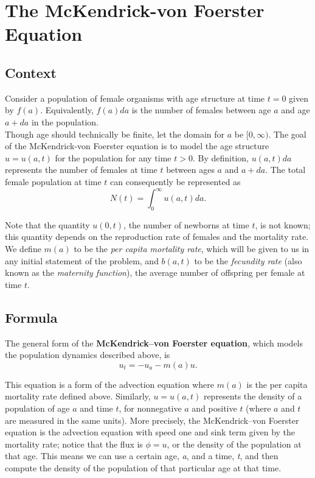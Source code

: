 \section{The McKendrick-von Foerster Equation}\setcounter{secnumdepth}{2}

\subsection{Context}


Consider a population of female organisms with age structure at time $t=0$ given by $f(a)$. Equivalently, $f(a)da$ is the number of females between age $a$ and age $a+da$ in the population. \\

Though age should technically be finite, let the domain for $a$ be $[0, \infty).$ The goal of the McKendrick-von Foerster equation is to model the age structure $u=u(a, t)$ for the population for any time $t > 0$. By definition, $u(a, t) da$ represents the number of females at time $t$ between ages $a$ and $a+da$. The total female population at time $t$ can consequently be represented as
\[ N(t) = \int_0^{\infty} u(a, t) da.\]

Note that the quantity $u(0, t)$, the number of newborns at time $t$, is not known; this quantity depends on the reproduction rate of females and the mortality rate. We define $m(a)$ to be the \textit{per capita mortality rate}, which will be given to us in any initial statement of the problem, and $b(a, t)$ to be the \textit{fecundity rate} (also known as the \textit{maternity function}), the average number of offspring per female at time $t$. 
\subsection{Formula}



The general form of the \textbf{McKendrick–von Foerster equation}, which models the population dynamics described above, is
    \[ u_t = -u_a - m(a)u. \]
    
This equation is a form of the advection equation where $m(a)$ is the per capita mortality rate defined above. Similarly, $u = u(a, t)$ represents the density of a population of age $a$ and time $t$, for nonnegative $a$ and positive $t$ (where $a$ and $t$ are measured in the same units).  More precisely, the McKendrick–von Foerster equation is the advection equation with speed one and sink term given by the mortality rate; notice that the flux is $\phi = u$, or the density of the population at that age. This means we can use a certain age, \textit{a}, and a time, \textit{t}, and then compute the density of the population of that particular age at that time. \\


